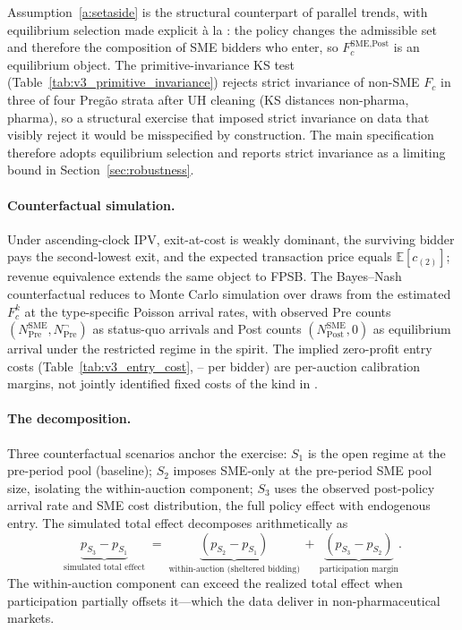 Assumption~\ref{a:setaside} is the structural counterpart of parallel trends, with equilibrium selection made explicit \`a la \citet{atheyseira2011}: the policy changes the admissible set and therefore the composition of SME bidders who enter, so $F_c^{\text{SME,Post}}$ is an equilibrium object. The primitive-invariance KS test (Table~\ref{tab:v3_primitive_invariance}) rejects strict invariance of non-SME $F_c$ in three of four Preg\~ao strata after UH cleaning (KS distances \ksNpPregaoUH{} non-pharma, \ksPharmaPregaoUH{} pharma), so a structural exercise that imposed strict invariance on data that visibly reject it would be misspecified by construction. The main specification therefore adopts equilibrium selection and reports strict invariance as a limiting bound in Section~\ref{sec:robustness}.

\paragraph{Counterfactual simulation.} Under ascending-clock IPV, exit-at-cost is weakly dominant, the surviving bidder pays the second-lowest exit, and the expected transaction price equals $\mathbb{E}[c_{(2)}]$; revenue equivalence \citep{vickrey1961, maskinriley2000} extends the same object to FPSB. The Bayes--Nash counterfactual reduces to Monte Carlo simulation over draws from the estimated $F_c^k$ at the type-specific Poisson arrival rates, with observed Pre counts $(N^{\text{SME}}_{\text{Pre}}, N^{\neg}_{\text{Pre}})$ as status-quo arrivals and Post counts $(N^{\text{SME}}_{\text{Post}}, 0)$ as equilibrium arrival under the restricted regime in the \citet{atheyseira2011} spirit. The implied zero-profit entry costs (Table~\ref{tab:v3_entry_cost}, \entryCostMin--\entryCostMax{} per bidder) are per-auction calibration margins, not jointly identified fixed costs of the kind in \citet{krasnokutskayaseim2011}.

\paragraph{The decomposition.} Three counterfactual scenarios anchor the exercise: $S_1$ is the open regime at the pre-period pool (baseline); $S_2$ imposes SME-only at the pre-period SME pool size, isolating the within-auction component; $S_3$ uses the observed post-policy arrival rate and SME cost distribution, the full policy effect with endogenous entry. The simulated total effect decomposes arithmetically as
\begin{equation}
\underbrace{p_{S_3} - p_{S_1}}_{\text{simulated total effect}}
\;=\; \underbrace{(p_{S_2} - p_{S_1})}_{\text{within-auction (sheltered bidding)}}
   \,+\, \underbrace{(p_{S_3} - p_{S_2})}_{\text{participation margin}}.
\end{equation}
The within-auction component can exceed the realized total effect when participation partially offsets it---which the data deliver in non-pharmaceutical markets.

